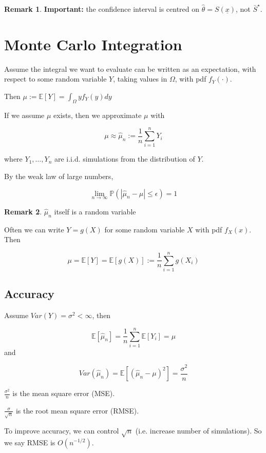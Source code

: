 \documentclass[12pt,a4paper]{article}
\theoremstyle{definition}
\newtheorem*{remark}{Remark}
\begin{document}
\begin{remark}
	\textbf{Important:} the confidence interval is centred on $\hat{\theta} = S(\underline{x})$, not $\bar{S}^{\star}$.
\end{remark}



\section{Monte Carlo Integration}

Assume the integral we want to evaluate can be written as an expectation, with respect to some random variable $Y$, taking values in $\Omega$, with pdf $f_Y(\cdot)$.

Then $\mu := \mathbb{E}[Y] = \int_{\Omega} y f_Y(y)dy$

If we assume $\mu$ exists, then we approximate $\mu$ with 

\[\mu \approx \hat{\mu}_n := \frac{1}{n} \sum_{i = 1}^{n} Y_i\]

where $Y_1, \dots, Y_n$ are i.i.d. simulations from the distribution of $Y$.

By the weak law of large numbers,

\[\lim_{n \rightarrow \infty} \mathbb{P}(|\hat{\mu}_n - \mu| \le \epsilon) = 1\]

\begin{remark}
	$\hat{\mu}_n$ itself is a random variable
\end{remark}

Often we can write $Y = g(X)$ for some random variable $X$ with pdf $f_X(x)$. Then

\[\mu = \mathbb{E}[Y] = \mathbb{E}[g(X)] := \frac{1}{n} \sum_{i = 1}^{n} g(X_i)\]

\subsection{Accuracy}

Assume $Var(Y) = \sigma^2 < \infty$, then

\[\mathbb{E}[\hat{\mu}_n] = \frac{1}{n} \sum_{i = 1}^{n} \mathbb{E}[Y_i] = \mu\] and 

\[Var(\hat{\mu}_n) = \mathbb{E}[{(\hat{\mu}_n - \mu)} ^ 2] = \frac{\sigma^2}{n}\]

$\frac{\sigma^2}{n}$ is the mean square error (MSE).

$\frac{\sigma}{\sqrt{n}}$ is the root mean square error (RMSE).

To improve accuracy, we can control $\sqrt{n}$ (i.e. increase number of simulations). So we say RMSE is $O(n^{-1 / 2})$.
\end{document}
